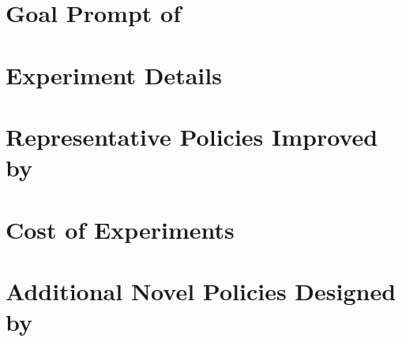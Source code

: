 \documentclass[11pt]{article}
\begin{document}
\section{Goal Prompt of \framework}


\section{Experiment Details}


\section{Representative Policies Improved by \framework}


\section{Cost of Experiments}


% 


\section{Additional Novel Policies Designed by \framework}

\end{document}
